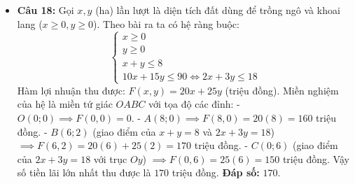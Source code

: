 \documentclass[12pt,a4paper]{article}
\begin{document}
\begin{itemize}[leftmargin=0.6cm, itemsep=3pt]
    \item \textbf{Câu 18:} Gọi $x, y$ (ha) lần lượt là diện tích đất dùng để trồng ngô và khoai lang ($x \ge 0, y \ge 0$).
    Theo bài ra ta có hệ ràng buộc:
    \[
    \begin{cases} x \ge 0 \\ y \ge 0 \\ x + y \le 8 \\ 10x + 15y \le 90 \iff 2x + 3y \le 18 \end{cases}
    \]
    Hàm lợi nhuận thu được: $F(x, y) = 20x + 25y$ (triệu đồng).
    Miền nghiệm của hệ là miền tứ giác $OABC$ với tọa độ các đỉnh:
    - $O(0; 0) \implies F(0, 0) = 0$.
    - $A(8; 0) \implies F(8, 0) = 20(8) = 160$ triệu đồng.
    - $B(6; 2)$ (giao điểm của $x + y = 8$ và $2x + 3y = 18$) $\implies F(6, 2) = 20(6) + 25(2) = 170$ triệu đồng.
    - $C(0; 6)$ (giao điểm của $2x + 3y = 18$ với trục $Oy$) $\implies F(0, 6) = 25(6) = 150$ triệu đồng.
    Vậy số tiền lãi lớn nhất thu được là $170$ triệu đồng.
    \textbf{Đáp số:} $170$.
\end{itemize}
\end{document}
